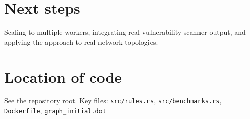 \documentclass[a4paper,11pt]{article}
\begin{document}
\section*{Next steps}
Scaling to multiple workers, integrating real vulnerability scanner output, and applying the approach to real network topologies.

\section*{Location of code}
See the repository root. Key files: \texttt{src/rules.rs}, \texttt{src/benchmarks.rs}, \texttt{Dockerfile}, \texttt{graph_initial.dot}
\end{document}
